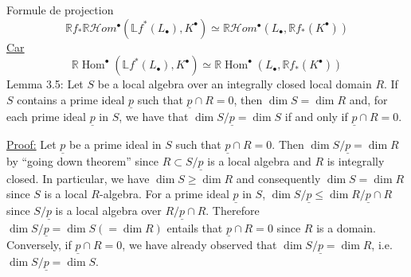 Formule de projection
\[
\mathbb Rf_*\mathbb R\mathcal Hom^\bullet(\mathbb Lf^*(L_\bullet),K^\bullet)\simeq\mathbb R\mathcal Hom^\bullet(L_\bullet,\mathbb Rf_*(K^\bullet))
\]
\uline{Car}
\[
\boxed{\mathbb R\operatorname{Hom}^\bullet(\mathbb Lf^*(L_\bullet),K^\bullet)\simeq\mathbb R\operatorname{Hom}^\bullet(L_\bullet,\mathbb Rf_*(K^\bullet))}
\]
Lemma 3.5: Let $S$ be a local algebra over an integrally closed local domain $R$. If $S$ contains a prime ideal $\underline p$ such that $\underline p\cap R=0$, then $\dim S=\dim R$ and, for each prime ideal $\underline p$ in $S$, we have that $\dim S/\underline p=\dim S$ if and only if $\underline p\cap R=0$.

\uline{Proof:} Let $\underline p$ be a prime ideal in $S$ such that $\underline p\cap R=0$. Then $\dim S/\underline p=\dim R$ by ``going down theorem'' since $R\subset S/\underline p$ is a local algebra and $R$ is integrally closed. In particular, we have $\dim S\geq\dim R$ and consequently $\dim S=\dim R$ since $S$ is a local $R$-algebra. For a prime ideal $\underline p$ in $S$, $\dim S/\underline p\leq\dim R/\underline p\cap R$ since $S/\underline p$ is a local algebra over $R/\underline p\cap R$. Therefore $\dim S/\underline p=\dim S(=\dim R)$ entails that $\underline p\cap R=0$ since $R$ is a domain. Conversely, if $\underline p\cap R=0$, we have already observed that $\dim S/\underline p=\dim R$, i.e. $\dim S/\underline p=\dim S$.
\margin{;}

